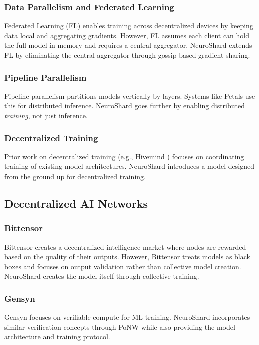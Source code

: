 \documentclass[11pt,a4paper]{article}
\begin{document}
\subsubsection{Data Parallelism and Federated Learning}
Federated Learning (FL) \cite{mcmahan2017communication} enables training across decentralized devices by keeping data local and aggregating gradients. However, FL assumes each client can hold the full model in memory and requires a central aggregator. NeuroShard extends FL by eliminating the central aggregator through gossip-based gradient sharing.

\subsubsection{Pipeline Parallelism}
Pipeline parallelism \cite{huang2019gpipe} partitions models vertically by layers. Systems like Petals \cite{borzunov2023petals} use this for distributed inference. NeuroShard goes further by enabling distributed \textit{training}, not just inference.

\subsubsection{Decentralized Training}
Prior work on decentralized training (e.g., Hivemind \cite{ryabinin2020hivemind}) focuses on coordinating training of existing model architectures. NeuroShard introduces a model designed from the ground up for decentralized training.

\subsection{Decentralized AI Networks}

\subsubsection{Bittensor}
Bittensor \cite{bittensor} creates a decentralized intelligence market where nodes are rewarded based on the quality of their outputs. However, Bittensor treats models as black boxes and focuses on output validation rather than collective model creation. NeuroShard creates the model itself through collective training.

\subsubsection{Gensyn}
Gensyn \cite{gensyn} focuses on verifiable compute for ML training. NeuroShard incorporates similar verification concepts through PoNW while also providing the model architecture and training protocol.
\end{document}

